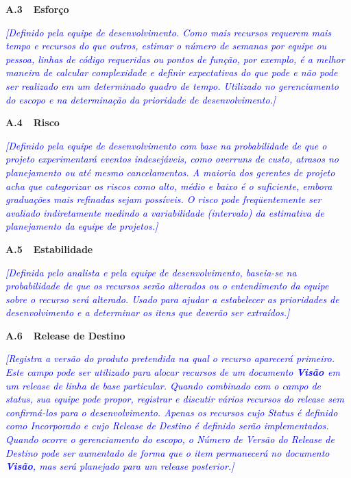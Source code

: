 \documentclass[a4paper]{article}
\begin{document}
\bigskip

\hypertarget{t98pr3e1edzr}{}\textbf{A.3\ \ Esfor\c{c}o}

\textit{\textcolor{blue}{[Definido pela equipe de desenvolvimento. Como mais recursos requerem mais tempo e recursos do
que outros, estimar o n\'umero de semanas por equipe ou pessoa, linhas de c\'odigo requeridas ou pontos de
fun\c{c}\~ao, por exemplo, \'e a melhor maneira de calcular complexidade e definir expectativas do que pode e n\~ao
pode ser realizado em um determinado quadro de tempo. Utilizado no gerenciamento do escopo e na determina\c{c}\~ao da
prioridade de desenvolvimento.]}}

\hypertarget{qxxknecjlc12}{}\textbf{A.4\ \ Risco}

\textit{\textcolor{blue}{[Definido pela equipe de desenvolvimento com base na probabilidade de que o projeto
experimentar\'a eventos indesej\'aveis, como overruns de custo, atrasos no planejamento ou at\'e mesmo cancelamentos. A
maioria dos gerentes de projeto acha que categorizar os riscos como alto, m\'edio e baixo \'e o suficiente, embora
gradua\c{c}\~oes mais refinadas sejam poss\'iveis. O risco pode freq\"uentemente ser avaliado indiretamente medindo a
variabilidade (intervalo) da estimativa de planejamento da equipe de projetos.]}}

\hypertarget{nxsqrvv9ty9t}{}\textbf{A.5\ \ Estabilidade}

\textit{\textcolor{blue}{[Definida pelo analista e pela equipe de desenvolvimento, baseia-se na probabilidade de que os
recursos ser\~ao alterados ou o entendimento da equipe sobre o recurso ser\'a alterado. Usado para ajudar a estabelecer
as prioridades de desenvolvimento e a determinar os itens que dever\~ao ser extra\'idos.]}}

\hypertarget{dy2rvads3twy}{}\textbf{A.6\ \ Release de Destino}

\textit{\textcolor{blue}{[Registra a vers\~ao do produto pretendida na qual o recurso aparecer\'a primeiro. Este campo
pode ser utilizado para alocar recursos de um documento }}\textbf{\textit{\textcolor{blue}{Vis\~ao
}}}\textit{\textcolor{blue}{em um release de linha de base particular. Quando combinado com o campo de status, sua
equipe pode propor, registrar e discutir v\'arios recursos do release sem confirm\'a-los para o desenvolvimento. Apenas
os recursos cujo Status \'e definido como Incorporado e cujo Release de Destino \'e definido ser\~ao implementados.
Quando ocorre o gerenciamento do escopo, o N\'umero de Vers\~ao do Release de Destino pode ser aumentado de forma que o
item permanecer\'a no documento }}\textbf{\textit{\textcolor{blue}{Vis\~ao}}}\textit{\textcolor{blue}{, mas ser\'a
planejado para um release posterior.]}}
\end{document}
